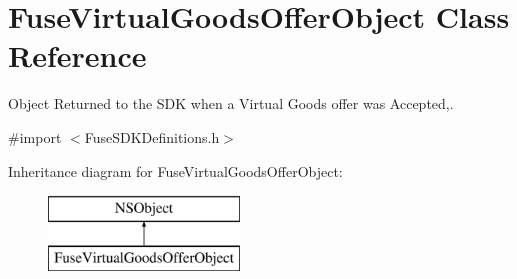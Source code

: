 \hypertarget{interface_fuse_virtual_goods_offer_object}{}\section{Fuse\+Virtual\+Goods\+Offer\+Object Class Reference}
\label{interface_fuse_virtual_goods_offer_object}


Object Returned to the S\+D\+K when a Virtual Goods offer was Accepted,.  




{\ttfamily \#import $<$Fuse\+S\+D\+K\+Definitions.\+h$>$}

Inheritance diagram for Fuse\+Virtual\+Goods\+Offer\+Object\+:\begin{figure}[H]
\begin{center}
\leavevmode
\includegraphics[height=2.000000cm]{interface_fuse_virtual_goods_offer_object}
\end{center}
\end{figure}
